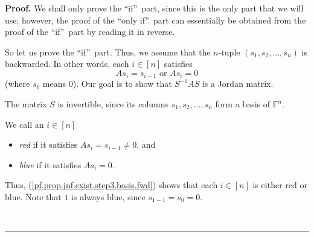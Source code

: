 \documentclass[numbers=enddot,12pt,final,onecolumn,notitlepage]{scrartcl}%
\numberwithin{exer}{subsection}
\theoremstyle{definition}
\newenvironment{proof}[1][Proof]{\noindent\textbf{#1.} }{\ \rule{0.5em}{0.5em}}
\begin{document}
\begin{proof}
We shall only prove the \textquotedblleft if\textquotedblright\ part, since
this is the only part that we will use; however, the proof of the
\textquotedblleft only if\textquotedblright\ part can essentially be obtained
from the proof of the \textquotedblleft if\textquotedblright\ part by reading
it in reverse.

So let us prove the \textquotedblleft if\textquotedblright\ part. Thus, we
assume that the $n$-tuple $\left(  s_{1},s_{2},\ldots,s_{n}\right)  $ is
backwarded. In other words, each $i\in\left[  n\right]  $ satisfies
\begin{equation}
As_{i}=s_{i-1}\text{ or }As_{i}=0 \label{pf.prop.jnf.exist.step3.basis.fwd}%
\end{equation}
(where $s_{0}$ means $0$). Our goal is to show that $S^{-1}AS$ is a Jordan matrix.

The matrix $S$ is invertible, since its columns $s_{1},s_{2},\ldots,s_{n}$
form a basis of $\mathbb{F}^{n}$.

We call an $i\in\left[  n\right]  $

\begin{itemize}
\item \emph{red} if it satisfies $As_{i}=s_{i-1}\neq0$, and

\item \emph{blue} if it satisfies $As_{i}=0$.
\end{itemize}

Thus, (\ref{pf.prop.jnf.exist.step3.basis.fwd}) shows that each $i\in\left[
n\right]  $ is either red or blue. Note that $1$ is always blue, since
$s_{1-1}=s_{0}=0$.


\end{proof}
\end{document}
